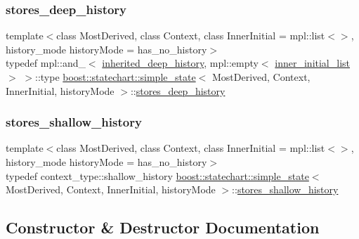 \subsubsection{\texorpdfstring{stores\+\_\+deep\+\_\+history}{stores\_deep\_history}}
{\footnotesize\ttfamily template$<$class Most\+Derived, class Context, class Inner\+Initial = mpl\+::list$<$$>$, history\+\_\+mode history\+Mode = has\+\_\+no\+\_\+history$>$ \\
typedef mpl\+::and\+\_\+$<$ \mbox{\hyperlink{classboost_1_1statechart_1_1simple__state_a0a3f8d8bb00bdd1769113111b2e2fae7}{inherited\+\_\+deep\+\_\+history}}, mpl\+::empty$<$ \mbox{\hyperlink{classboost_1_1statechart_1_1simple__state_ae86cab19f07d10cd8e46937fd243d4ba}{inner\+\_\+initial\+\_\+list}} $>$ $>$\+::type \mbox{\hyperlink{classboost_1_1statechart_1_1simple__state}{boost\+::statechart\+::simple\+\_\+state}}$<$ Most\+Derived, Context, Inner\+Initial, history\+Mode $>$\+::\mbox{\hyperlink{classboost_1_1statechart_1_1simple__state_ab912b321d44a14521b3c80e11fb919e1}{stores\+\_\+deep\+\_\+history}}}

\mbox{\label{classboost_1_1statechart_1_1simple__state_a0e837dc75eff343ab64337979fc7eca4}} 
\subsubsection{\texorpdfstring{stores\+\_\+shallow\+\_\+history}{stores\_shallow\_history}}
{\footnotesize\ttfamily template$<$class Most\+Derived, class Context, class Inner\+Initial = mpl\+::list$<$$>$, history\+\_\+mode history\+Mode = has\+\_\+no\+\_\+history$>$ \\
typedef context\+\_\+type\+::shallow\+\_\+history \mbox{\hyperlink{classboost_1_1statechart_1_1simple__state}{boost\+::statechart\+::simple\+\_\+state}}$<$ Most\+Derived, Context, Inner\+Initial, history\+Mode $>$\+::\mbox{\hyperlink{classboost_1_1statechart_1_1simple__state_a0e837dc75eff343ab64337979fc7eca4}{stores\+\_\+shallow\+\_\+history}}}



\subsection{Constructor \& Destructor Documentation}
\mbox{\label{classboost_1_1statechart_1_1simple__state_a362ee00744c845c6ee6c96a131a5f8af}} 
